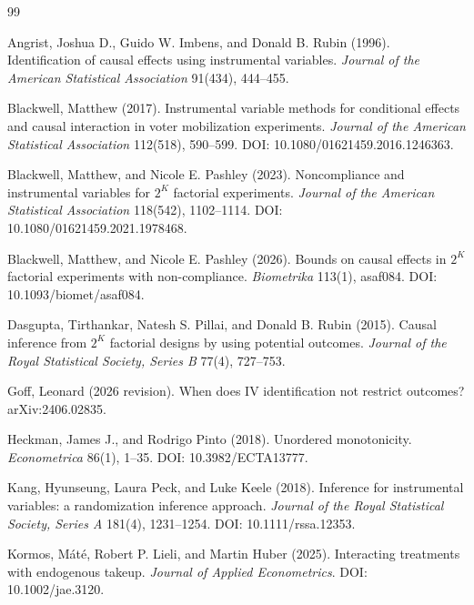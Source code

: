 \documentclass{article}
\begin{document}
\begin{thebibliography}{99}

   Angrist, Joshua D., Guido W. Imbens, and Donald B. Rubin (1996). Identification of causal effects using instrumental variables. \emph{Journal of the American Statistical Association} 91(434), 444--455.

   Blackwell, Matthew (2017). Instrumental variable methods for conditional effects and causal interaction in voter mobilization experiments. \emph{Journal of the American Statistical Association} 112(518), 590--599. DOI: 10.1080/01621459.2016.1246363.

   Blackwell, Matthew, and Nicole E. Pashley (2023). Noncompliance and instrumental variables for \(2^K\) factorial experiments. \emph{Journal of the American Statistical Association} 118(542), 1102--1114. DOI: 10.1080/01621459.2021.1978468.

   Blackwell, Matthew, and Nicole E. Pashley (2026). Bounds on causal effects in \(2^K\) factorial experiments with non-compliance. \emph{Biometrika} 113(1), asaf084. DOI: 10.1093/biomet/asaf084.

   Dasgupta, Tirthankar, Natesh S. Pillai, and Donald B. Rubin (2015). Causal inference from \(2^K\) factorial designs by using potential outcomes. \emph{Journal of the Royal Statistical Society, Series B} 77(4), 727--753.

   Goff, Leonard (2026 revision). When does IV identification not restrict outcomes? arXiv:2406.02835.

   Heckman, James J., and Rodrigo Pinto (2018). Unordered monotonicity. \emph{Econometrica} 86(1), 1--35. DOI: 10.3982/ECTA13777.

   Kang, Hyunseung, Laura Peck, and Luke Keele (2018). Inference for instrumental variables: a randomization inference approach. \emph{Journal of the Royal Statistical Society, Series A} 181(4), 1231--1254. DOI: 10.1111/rssa.12353.

   Kormos, Máté, Robert P. Lieli, and Martin Huber (2025). Interacting treatments with endogenous takeup. \emph{Journal of Applied Econometrics}. DOI: 10.1002/jae.3120.


\end{thebibliography}
\end{document}
